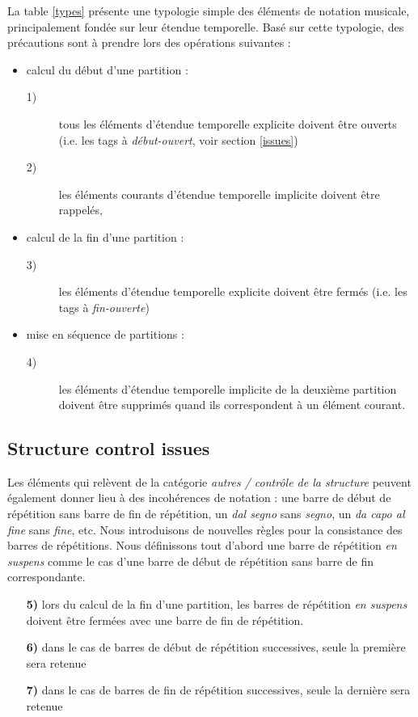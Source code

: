 \documentclass{article}
\newcommand{\oend}			{\emph{fin-ouverte}}
\newcommand{\obeg}			{\emph{début-ouvert}}
\newcommand{\rulenum}[1]	{\textbf{#1}}
\begin{document}
La table  \ref{types} présente une typologie simple des éléments de notation musicale, principalement fondée sur leur étendue temporelle. Basé sur cette typologie, des précautions sont à prendre lors des opérations suivantes :

\begin{itemize}
\item calcul du début d'une partition :  
\begin{description}
	\item[1)] tous les éléments d'étendue temporelle explicite doivent être ouverts (i.e. les tags à \obeg , voir section \ref{issues})
	\item[2)] les éléments courants d'étendue temporelle implicite  doivent être rappelés,
\end{description}
\item calcul de la fin d'une partition : 
\begin{description}
	\item[3)] les éléments d'étendue temporelle explicite doivent être fermés (i.e. les tags à \oend )
\end{description}
\item mise en séquence de partitions : 
\begin{description}
	\item[4)] les éléments d'étendue temporelle implicite de la deuxième partition doivent être supprimés quand ils correspondent à un élément courant.
\end{description}
\end{itemize}


\subsection{Structure control issues} \label{sc}
Les éléments qui relèvent de la catégorie \emph{autres / contrôle de la structure} peuvent également donner lieu à des incohérences de notation : une barre de début de répétition sans barre de fin de répétition, un \emph{dal segno} sans \emph{segno}, un \emph{da capo al fine} sans \emph{fine}, etc.
Nous introduisons de nouvelles règles pour la consistance des barres de répétitions. Nous définissons tout d'abord une barre de répétition \emph{en suspens} comme le cas d'une barre de début de répétition sans barre de fin correspondante. 
\begin{itemize}
\item[\rulenum{5)}] lors du calcul de la fin d'une partition, les barres de répétition \emph{en suspens} doivent être fermées avec une barre de fin de répétition.
\item[\rulenum{6)}] dans le cas de barres de début de répétition successives, seule la première sera retenue
\item[\rulenum{7)}] dans le cas de barres de fin de répétition successives, seule la dernière sera retenue
\end{itemize}
\end{document}
